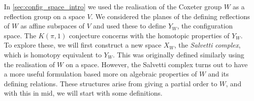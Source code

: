 \documentclass[class=article, crop=false]{standalone}
\begin{document}
In \cref{sec:config_space_intro} we used the realisation of the Coxeter group $W$ as a reflection group on a space $V$. We considered the planes of the defining reflections of $W$ as affine subspaces of $V$ and used these to define $Y_W$, the configuration space. The $K(\pi,1)$ conjecture concerns with the homotopic properties of $Y_W$. To explore these, we will first construct a new space $X_W$, the \emph{Salvetti complex}, which is homotopy equivalent to $Y_W$. This was originally defined \cite{salvetti_topology_1987, salvetti_homotopy_1994} similarly using the realisation of $W$ on a space. However, the Salvetti complex turns out to have a more useful formulation based more on algebraic properties of $W$ and its defining relations. These structures arise from giving a partial order to $W$, and with this in mid, we will start with some definitions. 
\end{document}
